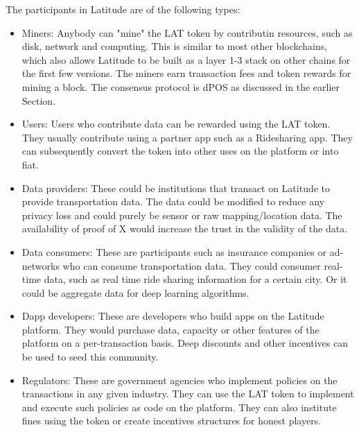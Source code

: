 The participants in Latitude are of the following types:
\begin{itemize}
    \item Miners: Anybody can "mine" the LAT token by contributin resources, such as disk, network and computing. This
        is similar to most other blockchains, which also allows Latitude to be built as a layer 1-3 stack on other
        chains for the first few versions. The miners earn transaction fees and token rewards for mining a block. The
        consensus protocol is dPOS as discussed in the earlier Section.
    \item Users: Users who contribute data can be rewarded using the LAT token. They usually contribute using a partner
        app such as a Ridesharing app. They can subsequently convert the token into other uses on the platform or into
        fiat.
    \item Data providers: These could be institutions that transact on Latitude to provide transportation data. The data
        could be modified to reduce any privacy loss and could purely be sensor or raw mapping/location data. The
        availability of proof of X would increase the trust in the validity of the data.
    \item Data consumers: These are participants such as insurance companies or ad-networks who can consume
        transportation data. They could consumer real-time data, such as real time ride sharing information for a
        certain city. Or it could be aggregate data for deep learning algorithms.
    \item Dapp developers: These are developers who build apps on the Latitude platform. They would purchase data,
        capacity or other features of the platform on a per-transaction basis. Deep discounts and other incentives can
        be used to seed this community.
    \item Regulators: These are government agencies who implement policies on the transactions in any given industry.
        They can use the LAT token to implement and execute such policies as code on the platform. They can also
        institute fines using the token or create incentives structures for honest players.
\end{itemize}

